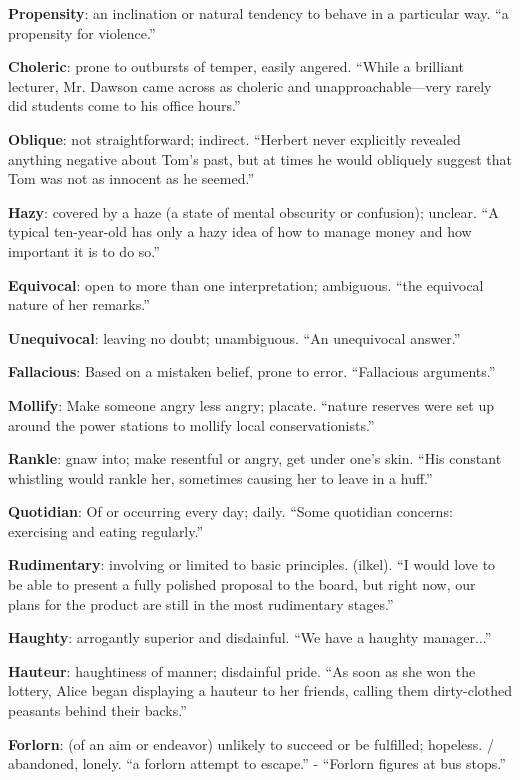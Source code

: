 \documentclass[12pt, a4paper]{ximera}
\begin{document}
\textbf{Propensity}: an inclination or natural tendency to behave in a particular way. ``a propensity for violence.''

\textbf{Choleric}: prone to outbursts of temper, easily angered. ``While a brilliant lecturer, Mr. Dawson came across as choleric and unapproachable—very rarely did students come to his office hours.''

\textbf{Oblique}: not straightforward; indirect. ``Herbert never explicitly revealed anything negative about Tom's past, but at times he would obliquely suggest that Tom was not as innocent as he seemed.''

\textbf{Hazy}: covered by a haze (a state of mental obscurity or confusion); unclear. ``A typical ten-year-old has only a hazy idea of how to manage money and how important it is to do so.''

\textbf{Equivocal}: open to more than one interpretation; ambiguous.  ``the equivocal nature of her remarks.''

\textbf{Unequivocal}: leaving no doubt; unambiguous. ``An unequivocal answer.''

\textbf{Fallacious}: Based on a mistaken belief, prone to error. ``Fallacious arguments.''

\textbf{Mollify}: Make someone angry less angry; placate. ``nature reserves were set up around the power stations to mollify local conservationists.''

\textbf{Rankle}: gnaw into; make resentful or angry, get under one's skin. ``His constant whistling would rankle her, sometimes causing her to leave in a huff.''

\textbf{Quotidian}: Of or occurring every day; daily. ``Some quotidian concerns: exercising and eating regularly.''

\textbf{Rudimentary}: involving or limited to basic principles. (ilkel). ``I would love to be able to present a fully polished proposal to the board, but right now, our plans for the product are still in the most rudimentary stages.''

\textbf{Haughty}: arrogantly superior and disdainful. ``We have a haughty manager...''

\textbf{Hauteur}: haughtiness of manner; disdainful pride. ``As soon as she won the lottery, Alice began displaying a hauteur to her friends, calling them dirty-clothed peasants behind their backs.''

\textbf{Forlorn}: (of an aim or endeavor) unlikely to succeed or be fulfilled; hopeless. / abandoned, lonely. ``a forlorn attempt to escape.'' - ``Forlorn figures at bus stops.''
\end{document}
